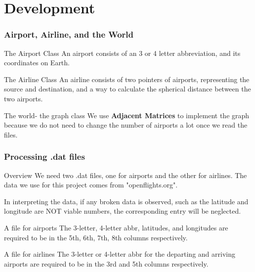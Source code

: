 \documentclass{beamer}
\begin{document}
\section{Development}

\begin{frame}
\frametitle{Airport, Airline, and the World}

\begin{block}{The Airport Class}
    An airport consists of an 3 or 4 letter abbreviation, and its coordinates on Earth. 
\end{block}

\begin{block}{The Airline Class}
    An airline consists of two pointers of airports, representing the source and destination, and a way to calculate the spherical distance between the two airports. 
\end{block}

\begin{block}{The world- the graph class}
    We use \textbf{Adjacent Matrices} to implement the graph because we do not need to change the number of airports a lot once we read the files.
\end{block}
    
\end{frame}



\begin{frame}
\frametitle{Processing .dat files}

\begin{block}{Overview}
    We need two .dat files, one for airports and the other for airlines. The data we use for this project comes from "openflights.org".
    
    In interpreting the data, if any broken data is observed, such as the latitude and longitude are NOT viable numbers, the corresponding entry will be neglected.
\end{block}

\begin{block}{A file for airports}
    The 3-letter, 4-letter abbr, latitudes, and longitudes are required to be in the 5th, 6th, 7th, 8th columns respectively.
\end{block}

\begin{block}{A file for airlines}
    The 3-letter or 4-letter abbr for the departing and arriving airports are required to be in the 3rd and 5th columns respectively.
\end{block}
    
\end{frame}
\end{document}
